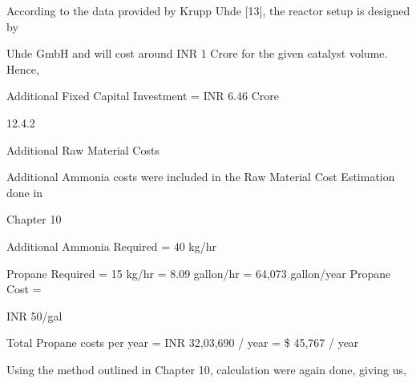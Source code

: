 \documentclass[a4paper,portrait,12pt]{article}
\begin{document}
\begin{flushleft}
According to the data provided by Krupp Uhde [13], the reactor setup is designed by
\end{flushleft}


\begin{flushleft}
Uhde GmbH and will cost around INR 1 Crore for the given catalyst volume. Hence,
\end{flushleft}


\begin{flushleft}
Additional Fixed Capital Investment = INR 6.46 Crore
\end{flushleft}





12.4.2





\begin{flushleft}
Additional Raw Material Costs
\end{flushleft}





\begin{flushleft}
Additional Ammonia costs were included in the Raw Material Cost Estimation done in
\end{flushleft}


\begin{flushleft}
Chapter 10
\end{flushleft}


\begin{flushleft}
Additional Ammonia Required = 40 kg/hr
\end{flushleft}


\begin{flushleft}
Propane Required = 15 kg/hr = 8.09 gallon/hr = 64,073 gallon/year Propane Cost =
\end{flushleft}


\begin{flushleft}
INR 50/gal
\end{flushleft}


\begin{flushleft}
Total Propane costs per year = INR 32,03,690 / year = \$ 45,767 / year
\end{flushleft}


\begin{flushleft}
Using the method outlined in Chapter 10, calculation were again done, giving us,
\end{flushleft}
\end{document}
